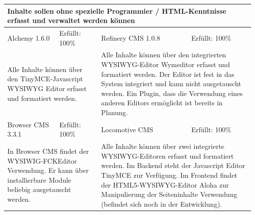 \newline
\newline
\newline
\begin{tabular}[!ht]{|l|l|l|l|}
\hline
\multicolumn{4}{|p{15cm}|}{\textbf{Inhalte sollen ohne spezielle Programmier / HTML-Kenntnisse erfasst und verwaltet werden können}} \\
\hline
  Alchemy 1.6.0 & \cellcolor{green}Erfüllt: 100\% & Refinery CMS 1.0.8 & \cellcolor{green}Erfüllt: 100\% \\
  \hline
  \multicolumn{2}{|p{7.5cm}|}{Alle Inhalte können über den TinyMCE-Javascript WYSIWYG Editor erfasst und formatiert werden.}
   & \multicolumn{2}{p{7.5cm}|}{Alle Inhalte können über den integrierten WYSIWYG-Editor Wymeditor erfasst und formatiert werden. Der Editor ist fest in das System integriert und kann nicht ausgetauscht werden. Ein Plugin, dass die Verwendung eines anderen Editors ermöglicht ist bereits in Planung.} \\
  \hline
  Browser CMS 3.3.1 & \cellcolor{green}Erfüllt: 100\% & Locomotive CMS & \cellcolor{green}Erfüllt: 100\% \\
  \hline
  \multicolumn{2}{|p{7.5cm}|}{In Browser CMS findet der WYSIWIG-FCKEditor Verwendung. Er kann über installierbare Module beliebig ausgetauscht werden.} & \multicolumn{2}{p{7.5cm}|}{Alle Inhalte können über zwei integrierte WYSIWYG-Editoren erfasst und formatiert werden. Im Backend steht der Javascript Editor TinyMCE zur Verfügung. Im Frontend findet der HTML5-WYSIWYG-Editor Aloha zur Manipulierung der Seiteninhalte Verwendung (befindet sich noch in der Entwicklung).} \\
\hline
\end{tabular}
\newline
\newline
\newline
